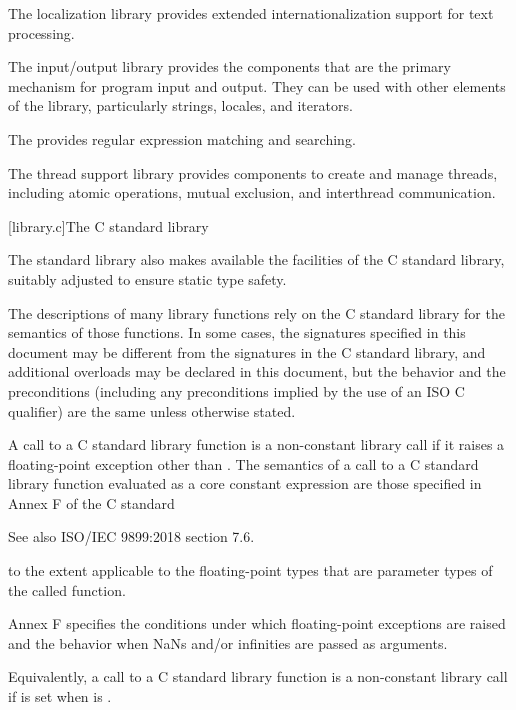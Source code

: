 \pnum
The localization library provides extended internationalization
support for text processing.

\pnum
The input/output library provides the
components that are the primary mechanism for \Cpp{} program input and output.
They can be used with other elements of the library, particularly
strings, locales, and iterators.

\pnum
The  provides regular expression matching and searching.

\pnum
The thread support library provides components to create
and manage threads,
including atomic operations, mutual exclusion, and interthread communication.

[library.c]{The C standard library}

\pnum
The \Cpp{} standard library also makes available the facilities of the C standard library,
%
suitably adjusted to ensure static type safety.

\pnum
The descriptions of many library functions rely on the C standard library for
the semantics of those functions.
In some cases,
the signatures specified in this document
may be different from the signatures in the C standard library,
and additional overloads may be declared in this document,
but the behavior and the preconditions
(including any preconditions implied by the use of an
ISO C  qualifier)
are the same unless otherwise stated.

\pnum
A call to a C standard library function is
a non-constant library call
if it raises a floating-point exception other than .
The semantics of a call to a C standard library function
evaluated as a core constant expression
are those specified in Annex F of the C standard
\begin{footnote}
See also ISO/IEC 9899:2018 section 7.6.
\end{footnote}
to the extent applicable to the floating-point types
that are parameter types of the called function.
\begin{note}
Annex F specifies
the conditions under which floating-point exceptions are raised and
the behavior when NaNs and/or infinities are passed as arguments.
\end{note}
\begin{note}
Equivalently, a call to a C standard library function is
a non-constant library call
if  is set
when  is .
\end{note}

